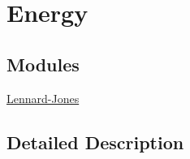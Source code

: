 \hypertarget{group___energy}{}\section{Energy}
\label{group___energy}
\subsection*{Modules}
\begin{DoxyCompactItemize}
\item 
\mbox{\hyperlink{group___lennard-_jones}{Lennard-\/\+Jones}}
\end{DoxyCompactItemize}


\subsection{Detailed Description}
